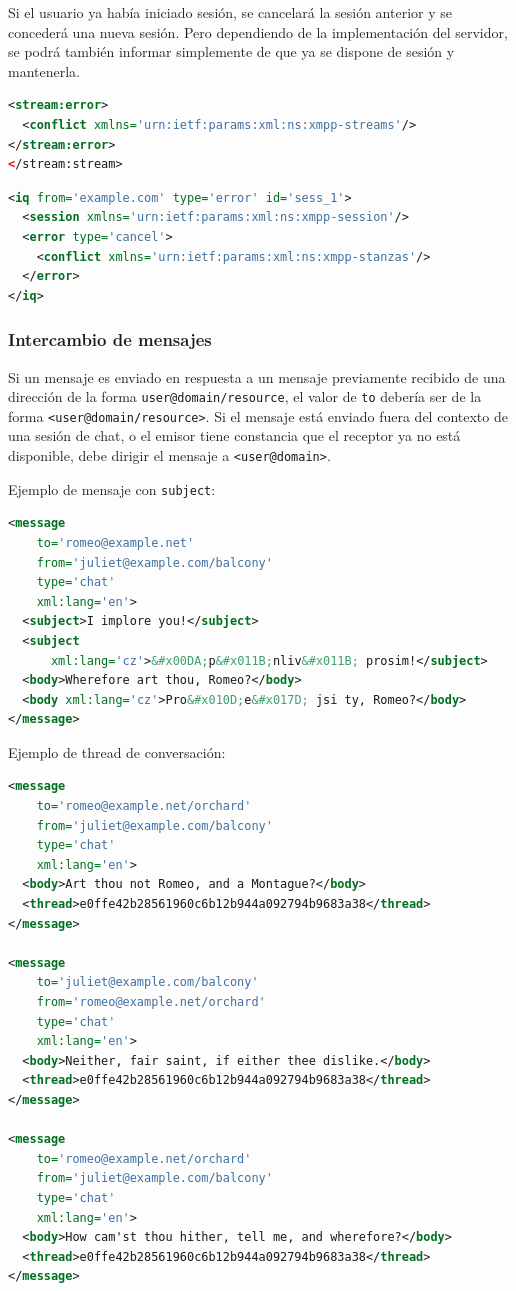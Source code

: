 \documentclass[a4paper, 11pt]{article} %
\begin{document}
    Si el usuario ya había iniciado sesión, se cancelará la sesión anterior y se concederá
    una nueva sesión. Pero dependiendo de la implementación del servidor, se podrá también informar
    simplemente de que ya se dispone de sesión y mantenerla.
    
\begin{lstlisting}[language=XML]
<stream:error>
  <conflict xmlns='urn:ietf:params:xml:ns:xmpp-streams'/>
</stream:error>
</stream:stream>
\end{lstlisting}
\begin{lstlisting}[language=XML]
<iq from='example.com' type='error' id='sess_1'>
  <session xmlns='urn:ietf:params:xml:ns:xmpp-session'/>
  <error type='cancel'>
    <conflict xmlns='urn:ietf:params:xml:ns:xmpp-stanzas'/>
  </error>
</iq>
\end{lstlisting}

    \subsubsection{Intercambio de mensajes}
      Si un mensaje es enviado en respuesta a un mensaje previamente recibido de una dirección de la forma 
      \texttt{user@domain/resource}, el valor de \texttt{to} debería ser de la forma \texttt{<user@domain/resource>}. Si el
      mensaje está enviado fuera del contexto de una sesión de chat, o el emisor tiene constancia que el receptor ya no
      está disponible, debe dirigir el mensaje a \texttt{<user@domain>}.
      
      Ejemplo de mensaje con \texttt{subject}:
\begin{lstlisting}[language=XML]  
<message
    to='romeo@example.net'
    from='juliet@example.com/balcony'
    type='chat'
    xml:lang='en'>
  <subject>I implore you!</subject>
  <subject
      xml:lang='cz'>&#x00DA;p&#x011B;nliv&#x011B; prosim!</subject>
  <body>Wherefore art thou, Romeo?</body>
  <body xml:lang='cz'>Pro&#x010D;e&#x017D; jsi ty, Romeo?</body>
</message> 
\end{lstlisting}
  
      Ejemplo de thread de conversación:
\begin{lstlisting}[language=XML]        
<message
    to='romeo@example.net/orchard'
    from='juliet@example.com/balcony'
    type='chat'
    xml:lang='en'>
  <body>Art thou not Romeo, and a Montague?</body>
  <thread>e0ffe42b28561960c6b12b944a092794b9683a38</thread>
</message>

<message
    to='juliet@example.com/balcony'
    from='romeo@example.net/orchard'
    type='chat'
    xml:lang='en'>
  <body>Neither, fair saint, if either thee dislike.</body>
  <thread>e0ffe42b28561960c6b12b944a092794b9683a38</thread>
</message>

<message
    to='romeo@example.net/orchard'
    from='juliet@example.com/balcony'
    type='chat'
    xml:lang='en'>
  <body>How cam'st thou hither, tell me, and wherefore?</body>
  <thread>e0ffe42b28561960c6b12b944a092794b9683a38</thread>
</message>
\end{lstlisting}
\end{document}
